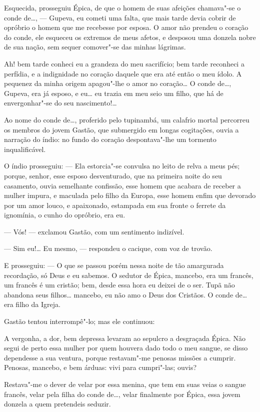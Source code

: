 Esquecida, prosseguiu Épica, de que o homem de suas afeições chamava"-se
o conde de\ldots{}, --- Gupeva, eu cometi uma falta, que mais tarde devia
cobrir de opróbrio o homem que me recebesse por esposa. O amor não
prendeu o coração do conde, ele esqueceu os extremos de meus afetos, e
desposou uma donzela nobre de sua nação, sem sequer comover"-se das
minhas lágrimas.

Ah! bem tarde conheci eu a grandeza do meu sacrifício; bem tarde
reconheci a perfídia, e a indignidade no coração daquele que era até
então o meu ídolo. A pequenez da minha origem apagou"-lhe o amor no
coração\ldots{} O conde de\ldots{}, Gupeva, era já esposo, e eu\ldots{} eu trazia em
meu seio um filho, que há de envergonhar"-se do seu nascimento!\ldots{}

Ao nome do conde de\ldots{}, proferido pelo tupinambá, um calafrio mortal
percorreu os membros do jovem Gastão, que submergido em longas
cogitações, ouvia a narração do índio: no fundo do coração
despontava"-lhe um tormento inqualificável.

O índio prosseguiu: --- Ela estorcia"-se convulsa no leito de relva a
meus pés; porque, senhor, esse esposo desventurado, que na primeira
noite do seu casamento, ouvia semelhante confissão, esse homem que
acabara de receber a mulher impura, e maculada pelo filho da Europa,
esse homem enfim que devorado por um amor louco, e apaixonado, estampada
em sua fronte o ferrete da ignomínia, o cunho do opróbrio, era eu.

--- Vós! --- exclamou Gastão, com um sentimento indizível.

--- Sim eu!\ldots{} Eu mesmo, --- respondeu o cacique, com voz de trovão.

E prosseguiu: --- O que se passou porém nessa noite de tão amargurada
recordação, só Deus e eu sabemos. O sedutor de Épica, mancebo, era um
francês, um francês é um cristão; bem, desde essa hora eu deixei de o
ser. Tupã não abandona seus filhos\ldots{} mancebo, eu não amo o Deus dos
Cristãos. O conde de\ldots{} era filho da Igreja.

Gastão tentou interrompê"-lo; mas ele continuou:

A vergonha, a dor, bem depressa levaram ao sepulcro a desgraçada Épica.
Não segui de perto essa mulher por quem houvera dado todo o meu sangue,
se disso dependesse a sua ventura, porque restavam"-me penosas missões a
cumprir. Penosas, mancebo, e bem árduas: vivi para cumpri"-las; ouvis?

Restava"-me o dever de velar por essa menina, que tem em suas veias o
sangue francês, velar pela filha do conde de\ldots{}, velar finalmente por
Épica, essa jovem donzela a quem pretendeis seduzir.

